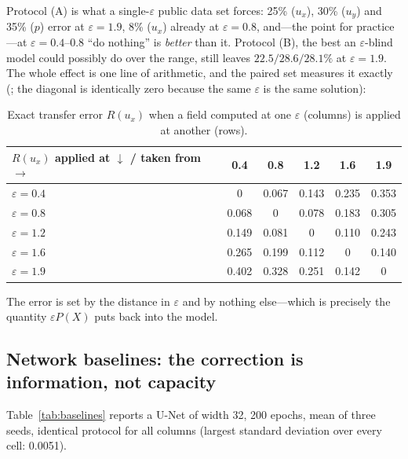 \documentclass[11pt,a4paper]{article}
\begin{document}
Protocol (A) is what a single-$\varepsilon$ public data set forces: 25\% ($u_x$), 30\% ($u_y$) and
35\% ($p$) error at $\varepsilon=1.9$, 8\% ($u_x$) already at $\varepsilon=0.8$, and---the point
for practice---at $\varepsilon=0.4$--$0.8$ ``do nothing'' is \emph{better} than it. Protocol (B),
the best an $\varepsilon$-blind model could possibly do over the range, still leaves
$22.5/28.6/28.1\%$ at $\varepsilon=1.9$. The whole effect is one line of arithmetic, and the paired
set measures it exactly (; the diagonal is identically zero
because the same $\varepsilon$ is the same solution):

\begin{table}[htbp]
\centering
\small
\caption{Exact transfer error $R(u_x)$ when a field computed at one $\varepsilon$ (columns) is
applied at another (rows).}
\label{tab:transfer-matrix}
\begin{tabular}{@{}lccccc@{}}
\toprule
$R(u_x)$ applied at $\downarrow$ / taken from $\to$ & 0.4 & 0.8 & 1.2 & 1.6 & 1.9\\
\midrule
$\varepsilon=0.4$ & 0 & 0.067 & 0.143 & 0.235 & 0.353\\
$\varepsilon=0.8$ & 0.068 & 0 & 0.078 & 0.183 & 0.305\\
$\varepsilon=1.2$ & 0.149 & 0.081 & 0 & 0.110 & 0.243\\
$\varepsilon=1.6$ & 0.265 & 0.199 & 0.112 & 0 & 0.140\\
$\varepsilon=1.9$ & 0.402 & 0.328 & 0.251 & 0.142 & 0\\
\bottomrule
\end{tabular}
\end{table}

The error is set by the distance in $\varepsilon$ and by nothing else---which is precisely the
quantity $\varepsilon P(X)$ puts back into the model.

\subsection{Network baselines: the correction is information, not capacity}
\label{sec:baselines}

Table~\ref{tab:baselines} reports a U-Net of width 32, 200 epochs, mean of three seeds, identical
protocol for all columns (largest standard deviation over every cell: 0.0051).
\end{document}
